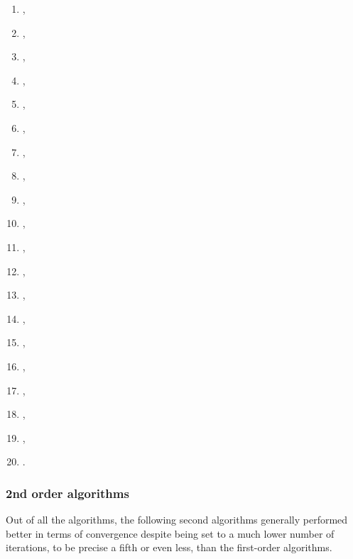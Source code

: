 \begin{enumerate}
\item
   \citep{R-rasclass},
\item
   \citep{R-rcane},
\item
   \citep{R-regressoR},
\item
   \citep{R-rminer},
\item
   \citep{R-rnn},
\item
   \citep{R-RSNNS},
\item
   \citep{R-ruta},
\item
   \citep{R-simpleNeural},
\item
   \citep{R-snnR},
\item
   \citep{R-softmaxreg},
\item
   \citep{R-Sojourn.Data},
\item
   \citep{R-spnn},
\item
   \citep{R-TeachNet},
\item
   \citep{R-tensorflow},
\item
   \citep{R-tfestimators},
\item
   \citep{R-trackdem},
\item
   \citep{R-TrafficBDE},
\item
   \citep{R-tsensembler},
\item
   \citep{R-validann},
\item
   \citep{R-zFactor}.
\end{enumerate}

\hypertarget{nd-order-algorithms}{%
\subsubsection{2nd order algorithms}\label{nd-order-algorithms}}

Out of all the algorithms, the following second algorithms generally
performed better in terms of convergence despite being set to a much
lower number of iterations, to be precise a fifth or even less, than the
first-order algorithms.

